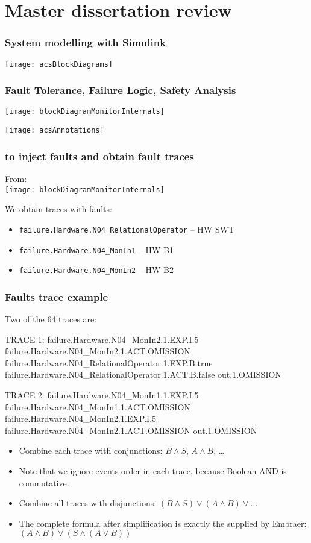 \section{Master dissertation review}

\begin{frame}
\frametitle{System modelling with Simulink}
\texttt{[image: acsBlockDiagrams]}
\end{frame}

\begin{frame}
\frametitle{Fault Tolerance, Failure Logic, Safety Analysis}
\texttt{[image: blockDiagramMonitorInternals]}\par
\texttt{[image: acsAnnotations]}
\end{frame}

\begin{frame}[fragile]
\frametitle{\CSPM to inject faults and obtain fault traces}
From:\\
\texttt{[image: blockDiagramMonitorInternals]}\par

We obtain traces with faults:
{\tiny
\begin{itemize}
  \item \verb|failure.Hardware.N04_RelationalOperator| -- HW SWT 
  \item \verb|failure.Hardware.N04_MonIn1| -- HW B1 
  \item \verb|failure.Hardware.N04_MonIn2| -- HW B2 
\end{itemize}
}

\end{frame}

\begin{frame}[fragile]
\frametitle{Faults trace example}
Two of the 64 traces are:
\begin{snippetcspm}[0]
TRACE 1:
failure.Hardware.N04_MonIn2.1.EXP.I.5
failure.Hardware.N04_MonIn2.1.ACT.OMISSION
failure.Hardware.N04_RelationalOperator.1.EXP.B.true
failure.Hardware.N04_RelationalOperator.1.ACT.B.false
out.1.OMISSION

TRACE 2:
failure.Hardware.N04_MonIn1.1.EXP.I.5
failure.Hardware.N04_MonIn1.1.ACT.OMISSION
failure.Hardware.N04_MonIn2.1.EXP.I.5
failure.Hardware.N04_MonIn2.1.ACT.OMISSION
out.1.OMISSION
\end{snippetcspm}

\begin{itemize}
  \item Combine each trace with conjunctions: $B \land S$, $A \land B$, \ldots
  \item <2-> Note that we ignore events order in each trace, because Boolean AND is commutative.
  \item Combine all traces with disjunctions: $(B \land S) \lor (A \land B) \lor \ldots$
  \item The complete formula after simplification is exactly the supplied by Embraer: $(A \land B) \lor (S \land (A \lor B))$
\end{itemize}
\end{frame}